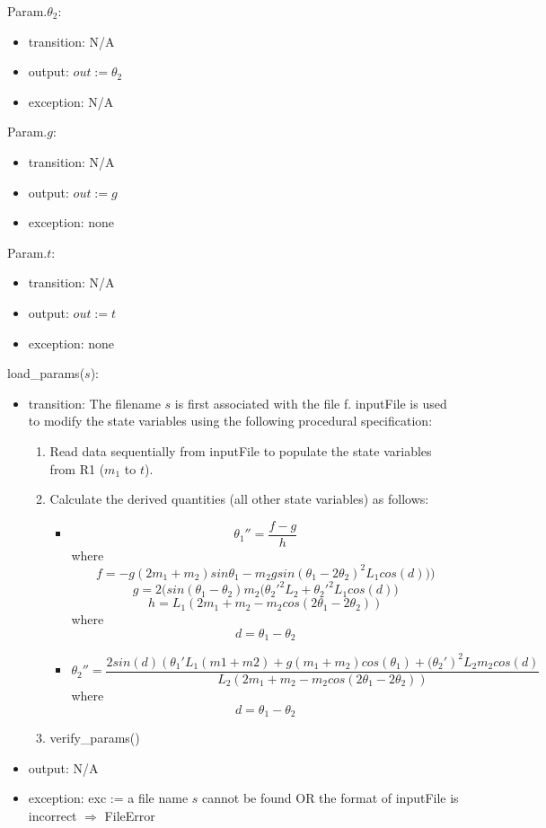 \documentclass[12pt, titlepage]{article}
\begin{document}
\noindent Param.$\theta_2$:
\begin{itemize}
\item transition: N/A
\item output: $out := \theta_2$
\item exception: N/A
\end{itemize}


\noindent Param.$g$:
\begin{itemize}
\item transition: N/A
\item output: $out := g$
\item exception: none
\end{itemize}

\noindent Param.$t$:
\begin{itemize}
\item transition: N/A
\item output: $out := t$
\item exception: none
\end{itemize}

\noindent load\_params($s$):
\begin{itemize}
\item transition: The filename $s$ is first associated with the file f.  {inputFile} is used to
  modify the state variables using the following procedural specification:
\begin{enumerate}
\item Read data sequentially from inputFile to populate the state variables from
  R1 ($m_1$ to $\mathit{t}$).
\item Calculate the derived quantities (all other state variables) as follows:
\begin{itemize}
\item \[{\theta_1}''=\frac{f-g}{h}\]\newline
  where \[f = -g(2m_1+m_2)sin\theta_1-m_2gsin(\theta_1-2\theta_2)^2L_1cos(d)))\]\newline
  \[g = 2(sin(\theta_1-\theta_2)m_2({{\theta_2}'}^2L_2+{{\theta_2}'}^2L_1cos(d)\big)\]
  \[h = L_1(2m_1+m_2-m_2cos(2\theta_1-2\theta_2))\]
  where \[d = \theta_1-\theta_2\]
\item \[{\theta_2}''=\frac{2sin(d)({\theta_1}'L_1(m1+m2)+g(m_1+m_2)cos(\theta_1)+{(\theta_2}')^2L_2m_2cos(d)}{L_2(2m_1+m_2-m_2cos(2\theta_1-2\theta_2))}\]
  where \[d = \theta_1-\theta_2\]

\end{itemize}
\item verify\_params()


\end{enumerate}
\item output: N/A
\item exception: exc := a file name $s$ cannot be found OR the format of
  inputFile is incorrect $\Rightarrow$  FileError
\end{itemize}
\end{document}
